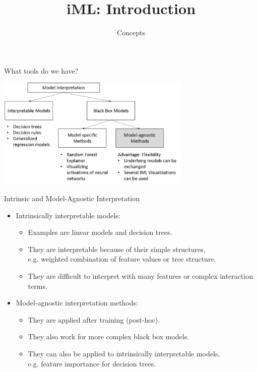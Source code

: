 \documentclass[aspectratio=169]{../latex_main/tntbeamer}  %
\title[Introduction]{iML: Introduction}
\subtitle{Concepts}
\begin{document}
	
	\maketitle


\begin{frame}[c]{What tools do we have?}
	\begin{center}
		\includegraphics[width=0.7\textwidth]{figure/overview}
	\end{center}
\end{frame}

\begin{frame}[c]{Intrinsic and Model-Agnostic Interpretation}
	\begin{itemize}
		\item Intrinsically interpretable models:
		\begin{itemize}
			\item Examples are linear models and decision trees.
			\item They are interpretable because of their simple structures,\\ 
			e.g. weighted combination of feature values or tree structure. 
			\item They are difficult to interpret with many features or complex interaction terms.
		\end{itemize}
	\bigskip
	\pause
		\item Model-agnostic interpretation methods:
		\begin{itemize}
			\item They are applied after training (post-hoc).
			\item They also work for more complex black box models.
			\item They can also be applied to intrinsically interpretable models,\\ 
			e.g. feature importance for decision trees. 
		\end{itemize}
	\end{itemize}
\end{frame}
\end{document}
